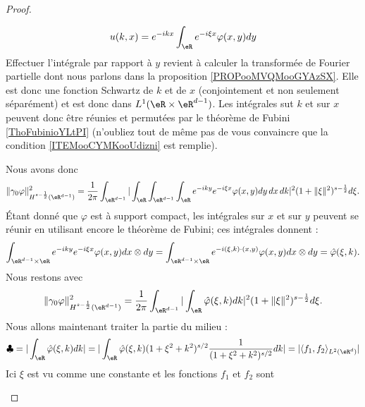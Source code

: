 \begin{proof}
\begin{subproof}
\begin{equation}
                u(k,x)= e^{-ikx}\int_{\eR} e^{-i\xi x}\varphi(x,y)dy
            \end{equation}
            Effectuer l'intégrale par rapport à $y$ revient à calculer la transformée de Fourier partielle dont nous parlons dans la proposition \ref{PROPooMVQMooGYAzSX}. Elle est donc une fonction Schwartz de \( k\) et de \( x\) (conjointement et non seulement séparément) et est donc dans \( L^1(\eR\times \eR^{d-1})\). Les intégrales sut \( k \) et sur \( x\) peuvent donc être réunies et permutées par le théorème de Fubini \ref{ThoFubinioYLtPI} (n'oubliez tout de même pas de vous convaincre que la condition \ref{ITEMooCYMKooUdizni} est remplie).

            Nous avons donc
            \begin{equation}
                \| \gamma_0\varphi \|^2_{H^{s-\frac{ 1 }{2}}(\eR^{d-1})}=\frac{1}{ 2\pi }\int_{\eR^{d-1}}|\int_{\eR}\int_{\eR^{d-1}}\int_{\eR} e^{-iky} e^{-i\xi x}\varphi(x,y)dy\,dx\,dk|^2(1+\| \xi \|^2)^{s-\frac{ 1 }{2}}d\xi.
            \end{equation}
            Étant donné que \( \varphi\) est à support compact, les intégrales sur \( x\) et sur \( y\) peuvent se réunir en utilisant encore le théorème de Fubini; ces intégrales donnent :
            \begin{equation}
                \int_{\eR^{d-1}\times \eR} e^{-iky} e^{-i\xi x}\varphi(x,y)dx\otimes dy=\int_{\eR^{d-1}\times \eR} e^{  -i(\xi,k)\cdot(x,y)  }\varphi(x,y)dx\otimes dy=\hat \varphi(\xi,k).
            \end{equation}
            Nous restons avec
            \begin{equation}
                \| \gamma_0\varphi \|^2_{H^{s-\frac{ 1 }{2}}(\eR^{d-1})}=\frac{1}{ 2\pi }\int_{\eR^{d-1}}|   \int_{\eR}\hat \varphi(\xi,k)dk    |^2(1+\| \xi \|^2)^{s-\frac{ 1 }{2}}d\xi.
            \end{equation}
            Nous allons maintenant traiter la partie du milieu :
            \begin{equation}
                \clubsuit=|\int_{\eR}\hat \varphi(\xi,k)dk|=| \int_{\eR}\hat \varphi(\xi,k)(1+\xi^2+k^2)^{s/2}\frac{1}{ (1+\xi^2+k^2)^{s/2} }dk |=| \langle f_1, f_2\rangle_{L^2(\eR^d)} |
            \end{equation}
            Ici \( \xi\) est vu comme une constante et les fonctions \( f_1\) et \( f_2\) sont
            \begin{subequations}

\end{subequations}
\end{subproof}
\end{proof}
